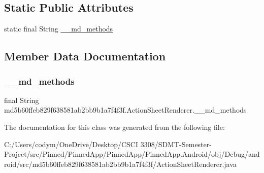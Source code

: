\subsection*{Static Public Attributes}
\begin{DoxyCompactItemize}
\item 
static final String \hyperlink{classmd5b60ffeb829f638581ab2bb9b1a7f4f3f_1_1_action_sheet_renderer_aba5845659bc7d9990f99b9029736fd0b}{\+\_\+\+\_\+md\+\_\+methods}
\end{DoxyCompactItemize}


\subsection{Member Data Documentation}
\mbox{\label{classmd5b60ffeb829f638581ab2bb9b1a7f4f3f_1_1_action_sheet_renderer_aba5845659bc7d9990f99b9029736fd0b}} 
\subsubsection{\texorpdfstring{\+\_\+\+\_\+md\+\_\+methods}{\_\_md\_methods}}
{\footnotesize\ttfamily final String md5b60ffeb829f638581ab2bb9b1a7f4f3f.\+Action\+Sheet\+Renderer.\+\_\+\+\_\+md\+\_\+methods\hspace{0.3cm}{\ttfamily [static]}}



The documentation for this class was generated from the following file\+:\begin{DoxyCompactItemize}
\item 
C\+:/\+Users/codym/\+One\+Drive/\+Desktop/\+C\+S\+C\+I 3308/\+S\+D\+M\+T-\/\+Semester-\/\+Project/src/\+Pinned/\+Pinned\+App/\+Pinned\+App/\+Pinned\+App.\+Android/obj/\+Debug/android/src/md5b60ffeb829f638581ab2bb9b1a7f4f3f/Action\+Sheet\+Renderer.\+java\end{DoxyCompactItemize}
